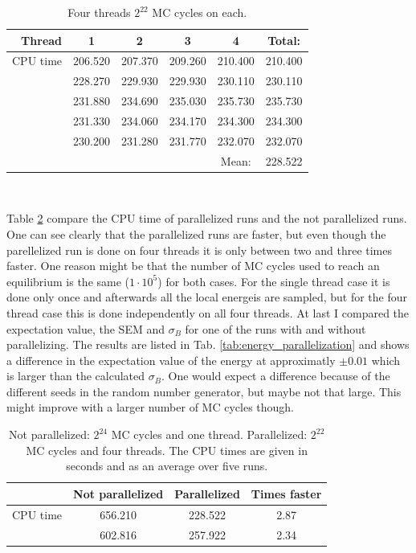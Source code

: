 \begin{table}[H]\caption{Four threads $2^{22}$ MC cycles on each.}\label{tab:CPUtime_treads}
\center
\begin{tabular}{r|cccc|c}
Thread & 1 & 2 & 3 & 4 & Total: \\ \hline
CPU time & 206.520 & 207.370 & 209.260 & 210.400 & 210.400 \\
& 228.270 & 229.930 & 229.930 & 230.110 & 230.110 \\
& 231.880 & 234.690 & 235.030 & 235.730 & 235.730 \\
& 231.330 & 234.060 & 234.170 & 234.300 & 234.300 \\
& 230.200 & 231.280 & 231.770 & 232.070 & 232.070 \\ \hline
 &  &  &  & Mean: & 228.522 \\
\end{tabular}\\
\end{table}

Table \ref{tab:CPUtime_parallelization} compare the CPU time of parallelized runs and the not parallelized runs. One can see clearly that the parallelized runs are faster, but even though the parellelized run is done on four threads it is only between two and three times faster. One reason might be that the number of MC cycles used to reach an equilibrium is the same ($1\cdot 10^5$) for both cases. For the single thread case it is done only once and afterwards all the local energeis are sampled, but for the four thread case this is done independently on all four threads. At last I compared the expectation value, the SEM and $\sigma_B$ for one of the runs with and without parallelizing. The results are listed in Tab. \ref{tab:energy_parallelization} and shows a difference in the expectation value of the energy at approximatly $\pm 0.01$ which is larger than the calculated $\sigma_B$. One would expect a difference because of the different seeds in the random number generator, but maybe not that large. This might improve with a larger number of MC cycles though. 

\begin{table}[H]\caption{Not parallelized: $2^{24}$ MC cycles and one thread. Parallelized: $2^{22}$ MC cycles and four threads. The CPU times are given in seconds and as an average over five runs.}\label{tab:CPUtime_parallelization}
\center
\begin{tabular}{r|ccc}
& Not parallelized & Parallelized & Times faster \\ \hline
CPU time &  656.210  & 228.522 & 2.87\\
 & 602.816   & 257.922  & 2.34\\
\end{tabular}
\end{table}

